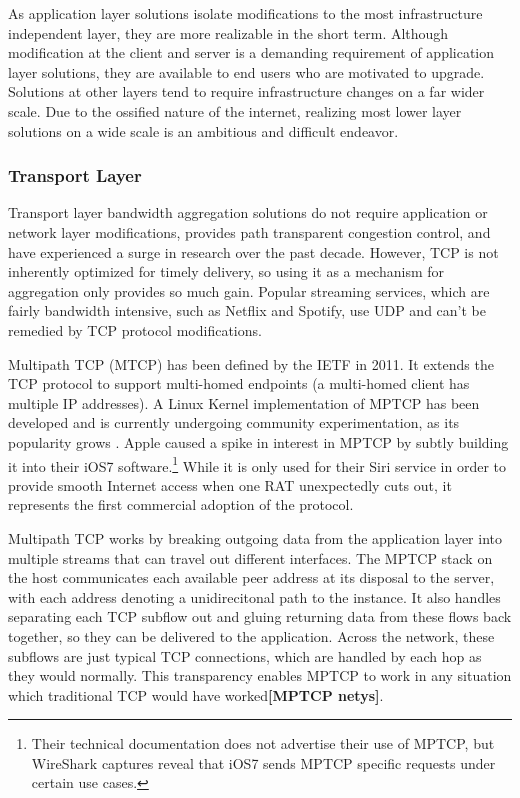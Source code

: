 \documentclass[12pt]{article}
\newcommand{\lcite}[1]
{{\bfseries\color{orange}[#1]}}
\begin{document}
		As application layer solutions isolate modifications to the most infrastructure independent layer, they are more realizable in the short term. Although modification at the client and server is a demanding requirement of application layer solutions, they are available to end users who are motivated to upgrade. Solutions at other layers tend to require infrastructure changes on a far wider scale. Due to the ossified nature of the internet, realizing most lower layer solutions on a wide scale is an ambitious and difficult endeavor.

	\subsubsection{Transport Layer}

		Transport layer bandwidth aggregation solutions do not require application or network layer modifications, provides path transparent congestion control, and have experienced a surge in research over the past decade\cite{5763587}. However, TCP is not inherently optimized for timely delivery, so using it as a mechanism for aggregation only provides so much gain. Popular streaming services, which are fairly bandwidth intensive, such as Netflix and Spotify, use UDP and can't be remedied by TCP protocol modifications.

		Multipath TCP (MTCP) has been defined by the IETF in 2011. It extends the TCP protocol to support multi-homed endpoints (a multi-homed client has multiple IP addresses). A Linux Kernel implementation of MPTCP has been developed and is currently undergoing community experimentation, as its popularity grows \cite{barre2011multipath}. Apple caused a spike in interest in MPTCP by subtly building it into their iOS7 software.\footnote{Their technical documentation does not advertise their use of MPTCP, but WireShark captures reveal that iOS7 sends MPTCP specific requests under certain use cases.} While it is only used for their Siri service in order to provide smooth Internet access when one RAT unexpectedly cuts out, it represents the first commercial adoption of the protocol.

		Multipath TCP works by breaking outgoing data from the application layer into multiple streams that can travel out different interfaces. The MPTCP stack on the host communicates each available peer address at its disposal to the server, with each address denoting a unidirecitonal path to the instance. It also handles separating each TCP subflow out and gluing returning data from these flows back together, so they can be delivered to the application. Across the network, these subflows are just typical TCP connections, which are handled by each hop as they would normally. This transparency enables MPTCP to work in any situation which traditional TCP would have worked\lcite{MPTCP netys}.
\end{document}
